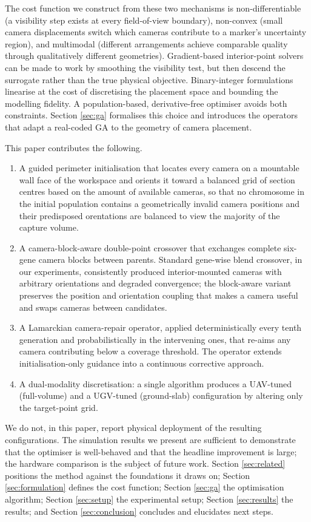 \documentclass[conference]{IEEEtran}
\begin{document}
The cost function we construct from these two mechanisms is non-differentiable (a visibility step exists at every field-of-view
boundary), non-convex (small camera displacements switch which cameras contribute to a marker's uncertainty region), and multimodal (different arrangements achieve comparable quality through qualitatively different geometries). Gradient-based interior-point solvers can be made to work by smoothing the visibility test, but then descend the surrogate rather than the true physical objective. Binary-integer formulations linearise at the cost of discretising the placement space and bounding the modelling fidelity. A population-based, derivative-free optimiser avoids both constraints. Section \ref{sec:ga} formalises this choice and introduces the operators that adapt a real-coded GA to the geometry of camera placement.

This paper contributes the following.
\begin{enumerate}
\item A guided perimeter initialisation that locates every camera on a mountable wall face of the workspace and orients it toward a balanced grid of section centres based on the amount of available cameras, so that no chromosome in the initial population contains a geometrically invalid camera positions and their predisposed orentations are balanced to view the majority of the capture volume.
\item A camera-block-aware double-point crossover that exchanges complete six-gene camera blocks between parents. Standard gene-wise blend crossover, in our experiments, consistently produced interior-mounted cameras with arbitrary orientations and degraded convergence; the block-aware variant preserves the position and orientation coupling that makes a camera useful and swaps cameras between candidates.
\item A Lamarckian camera-repair operator, applied deterministically every tenth generation and probabilistically in the intervening ones, that re-aims any camera contributing below a coverage threshold. The operator extends \textcite{aissaoui_designing_2018} initialisation-only guidance into a continuous corrective approach.
\item A dual-modality discretisation: a single algorithm produces a UAV-tuned (full-volume) and a UGV-tuned (ground-slab) configuration by altering only the target-point grid.
\end{enumerate}

We do not, in this paper, report physical deployment of the resulting configurations. The simulation results we present are sufficient to demonstrate that the optimiser is well-behaved and that the headline improvement is large; the hardware comparison is the subject of future work. Section \ref{sec:related} positions the method against the foundations it draws on; Section \ref{sec:formulation} defines the cost function; Section \ref{sec:ga} the optimisation algorithm; Section \ref{sec:setup} the experimental setup; Section \ref{sec:results} the results; and Section \ref{sec:conclusion} concludes and elucidates next steps.
\end{document}
